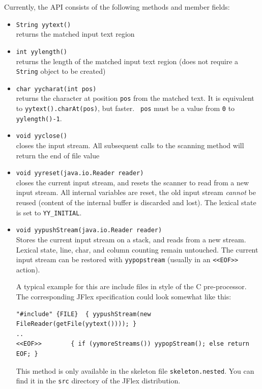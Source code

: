 \documentclass[11pt]{scrartcl}
\begin{document}
Currently, the API consists of the following methods and member fields:
\begin{itemize}
\item \texttt{String yytext()}\\
  returns the matched input text region

\item \texttt{int yylength()}\\
  returns the length of the matched input text region (does not require
  a \texttt{String} object to be created)
  
\item \texttt{char yycharat(int pos)}\\
  returns the character at position \texttt{pos} from the matched text.
  It is equivalent to \texttt{yytext().charAt(pos)}, but faster.  {\tt
  pos} must be a value from \texttt{0} to \texttt{yylength()-1}.

\item \texttt{void yyclose()}\\
  closes the input stream. All subsequent calls to the scanning method will 
  return the end of file value    

\item \texttt{void yyreset(java.io.Reader reader)}\\
  closes the current input stream, and resets the scanner to read from
  a new input stream.  All internal variables are reset, the old input
  stream {\em cannot} be reused (content of the internal buffer is
  discarded and lost).  The lexical state is set to \texttt{YY\_INITIAL}.

\item \texttt{void yypushStream(java.io.Reader reader)}\\
 Stores the current input stream on a stack, and
 reads from a new stream. Lexical state, line,
 char, and column counting remain untouched.
 The current input stream can be restored with
 \texttt{yypopstream} (usually in an \texttt{<<EOF>>} action).
 
 A typical example for this are include files in
 style of the C pre-processor. The corresponding 
 JFlex specification could look somewhat like this:
\begin{verbatim}
"#include" {FILE}  { yypushStream(new FileReader(getFile(yytext()))); }
..
<<EOF>>        { if (yymoreStreams()) yypopStream(); else return EOF; }
\end{verbatim}

 This method is only available in the skeleton file
 \texttt{skeleton.nested}. You can find it in the 
 \texttt{src} directory of the JFlex distribution.


\end{itemize}
\end{document}
